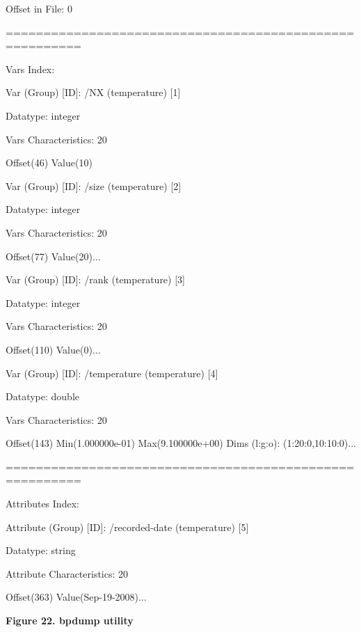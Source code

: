\parindent=28pt
Offset in File: 0

\parindent=0pt
========================================================

Vars Index:

Var (Group) [ID]: /NX (temperature) [1]

\parindent=28pt
Datatype: integer

Vars Characteristics: 20

\parindent=0pt
Offset(46)              Value(10)

Var (Group) [ID]: /size (temperature) [2]

\parindent=28pt
Datatype: integer

Vars Characteristics: 20

\parindent=0pt
Offset(77)              Value(20)...

Var (Group) [ID]: /rank (temperature) [3]

\parindent=28pt
Datatype: integer

Vars Characteristics: 20

\parindent=86pt
Offset(110)             Value(0)...

\parindent=0pt
Var (Group) [ID]: /temperature (temperature) [4]

\parindent=28pt
Datatype: double

Vars Characteristics: 20

\parindent=86pt
Offset(143)             Min(1.000000e-01)               Max(9.100000e+00)      
         Dims (l:g:o): (1:20:0,10:10:0)...

\parindent=0pt
========================================================

Attributes Index:

Attribute (Group) [ID]: /recorded-date (temperature) [5]

\parindent=28pt
Datatype: string

Attribute Characteristics: 20

\parindent=0pt
Offset(363)             Value(Sep-19-2008)...

\label{HRef119579247}\label{HToc144350181}

\leftskip=18pt
{\color{color20} \textbf{Figure 22. bpdump utility\label{HToc84890281}\label{HToc212016657}\label{HToc212016899}\label{HToc182553430}}}
